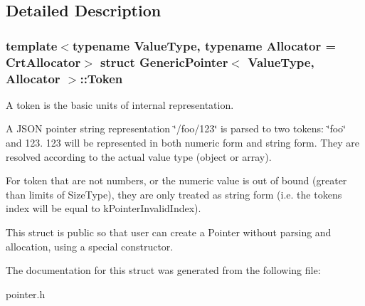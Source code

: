 \subsection{Detailed Description}
\subsubsection*{template$<$typename Value\+Type, typename Allocator = Crt\+Allocator$>$\newline
struct Generic\+Pointer$<$ Value\+Type, Allocator $>$\+::\+Token}

A token is the basic units of internal representation. 

A J\+S\+ON pointer string representation \char`\"{}/foo/123\char`\"{} is parsed to two tokens\+: \char`\"{}foo\char`\"{} and 123. 123 will be represented in both numeric form and string form. They are resolved according to the actual value type (object or array).

For token that are not numbers, or the numeric value is out of bound (greater than limits of Size\+Type), they are only treated as string form (i.\+e. the token\textquotesingle{}s index will be equal to k\+Pointer\+Invalid\+Index).

This struct is public so that user can create a Pointer without parsing and allocation, using a special constructor. 

The documentation for this struct was generated from the following file\+:\begin{DoxyCompactItemize}
\item 
pointer.\+h\end{DoxyCompactItemize}

